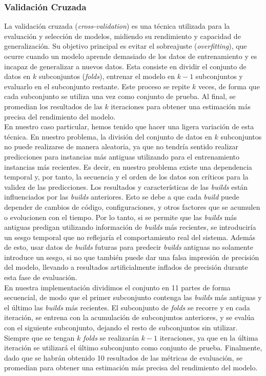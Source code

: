 \subsubsection{Validación Cruzada}
La validación cruzada (\textit{cross-validation}) es una técnica utilizada para la evaluación y
selección de modelos, midiendo su rendimiento y capacidad de generalización. Su objetivo
principal es evitar el sobreajuste (\textit{overfitting}), que ocurre cuando un modelo
aprende demasiado de los datos de entrenamiento y es incapaz de generalizar a nuevos datos. Esta
consiste en dividir el conjunto de datos en $k$ subconjuntos (\textit{folds}), entrenar el modelo
en $k-1$ subconjuntos y evaluarlo en el subconjunto restante. Este proceso se repite $k$ veces,
de forma que cada subconjunto se utiliza una vez como conjunto de prueba. Al final, se promedian
los resultados de las $k$ iteraciones para obtener una estimación más precisa del rendimiento del
modelo.\\

En nuestro caso particular, hemos tenido que hacer una ligera variación de esta técnica. En
nuestro problema, la división del conjunto de datos en $k$ subconjuntos no puede realizarse de
manera aleatoria, ya que no tendría sentido realizar predicciones para instancias más antiguas
utilizando para el entrenamiento instancias más recientes. Es decir, en nuestro problema existe
una dependencia temporal y, por tanto, la secuencia y el orden de los datos son críticos para la
validez de las predicciones. Los resultados y características de las \textit{builds} están
influenciados por las \textit{builds} anteriores. Esto se debe a que cada \textit{build} puede
depender de cambios de código, configuraciones, y otros factores que se acumulen o evolucionen
con el tiempo. Por lo tanto, si se permite que las \textit{builds} más antiguas predigan utilizando
información de \textit{builds} más recientes, se introduciría un sesgo temporal que no reflejaría
el comportamiento real del sistema. Además de esto, usar datos de \textit{builds} futuras para
predecir \textit{builds} antiguas no solamente introduce un sesgo, si no que también puede dar
una falsa impresión de precisión del modelo, llevando a resultados artificialmente inflados de
precisión durante esta fase de evaluación.\\

En nuestra implementación dividimos el conjunto en 11 partes de forma secuencial, de modo que el
primer subconjunto contenga las \textit{builds} más antiguas y el último las \textit{builds} más
recientes. El subconjunto de \textit{folds} se recorre y en cada iteración, se entrena con la
acumulación de subconjuntos anteriores, y se evalúa con el siguiente subconjunto, dejando el resto
de subconjuntos sin utilizar. Siempre que se tengan $k$ \textit{folds} se realizarán $k-1$
iteraciones, ya que en la última iteración se utilizará el último subconjunto como conjunto de
prueba. Finalmente, dado que se habrán obtenido 10 resultados de las métricas de evaluación, se
promedian para obtener una estimación más precisa del rendimiento del modelo.\\

